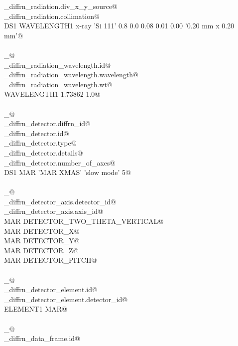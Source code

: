 \documentclass[10pt,a4paper,twoside,notitlepage]{article}
\begin{document}
\begin{flushleft}
\begin{minipage}{\linewidth}
\begin{list}{}{}
\mbox{}\verb@_diffrn_radiation.div_x_y_source@\\
\mbox{}\verb@_diffrn_radiation.collimation@\\
\mbox{}\verb@ DS1 WAVELENGTH1 x-ray 'Si 111' 0.8 0.0 0.08 0.01 0.00 '0.20 mm x 0.20 mm'@\\
\mbox{}\verb@@\\
\mbox{}\verb@loop_@\\
\mbox{}\verb@_diffrn_radiation_wavelength.id@\\
\mbox{}\verb@_diffrn_radiation_wavelength.wavelength@\\
\mbox{}\verb@_diffrn_radiation_wavelength.wt@\\
\mbox{}\verb@ WAVELENGTH1 1.73862 1.0@\\
\mbox{}\verb@@\\
\mbox{}\verb@loop_@\\
\mbox{}\verb@_diffrn_detector.diffrn_id@\\
\mbox{}\verb@_diffrn_detector.id@\\
\mbox{}\verb@_diffrn_detector.type@\\
\mbox{}\verb@_diffrn_detector.details@\\
\mbox{}\verb@_diffrn_detector.number_of_axes@\\
\mbox{}\verb@ DS1 MAR 'MAR XMAS' 'slow mode' 5@\\
\mbox{}\verb@@\\
\mbox{}\verb@loop_@\\
\mbox{}\verb@_diffrn_detector_axis.detector_id@\\
\mbox{}\verb@_diffrn_detector_axis.axis_id@\\
\mbox{}\verb@ MAR DETECTOR_TWO_THETA_VERTICAL@\\
\mbox{}\verb@ MAR DETECTOR_X@\\
\mbox{}\verb@ MAR DETECTOR_Y@\\
\mbox{}\verb@ MAR DETECTOR_Z@\\
\mbox{}\verb@ MAR DETECTOR_PITCH@\\
\mbox{}\verb@@\\
\mbox{}\verb@loop_@\\
\mbox{}\verb@_diffrn_detector_element.id@\\
\mbox{}\verb@_diffrn_detector_element.detector_id@\\
\mbox{}\verb@ ELEMENT1 MAR@\\
\mbox{}\verb@@\\
\mbox{}\verb@loop_@\\
\mbox{}\verb@_diffrn_data_frame.id@\\

\end{list}
\end{minipage}
\end{flushleft}
\end{document}
